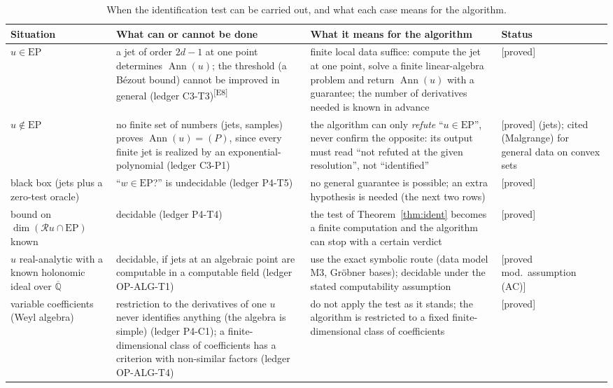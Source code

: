 \documentclass[11pt,a4paper]{article}
\theoremstyle{definition}
\newcommand{\badge}[2]{\textcolor{#1}{\textsf{\footnotesize[#2]}}}
\newcommand{\proved}[1][]{\badge{cC}{proved#1}}
\newcommand{\modulo}[1]{\badge{cD}{proved mod.\ #1}}
\newcommand{\led}[1]{\textcolor{cG}{\textsf{\footnotesize(ledger #1)}}}
\newcommand{\edmark}[1]{\textsuperscript{\textcolor{cB}{\textsf{[#1]}}}}
\newcommand{\Ann}{\operatorname{Ann}}
\newcommand{\EP}{\mathrm{EP}}
\newcommand{\ring}{\mathcal{R}}
\DeclareMathOperator{\dimc}{dim}
\begin{document}
\begin{table}[!htb]
\centering\footnotesize
\begin{tabular}{@{}L{2.5cm}L{4.5cm}L{5.1cm}L{2.3cm}@{}}
\toprule
Situation & What can or cannot be done & What it means for the algorithm & Status\\\midrule
$u\in\EP$ & a jet of order $2d-1$ at one point determines $\Ann(u)$; the threshold (a B\'ezout bound) cannot be improved in general \led{C3-T3}\edmark{E8} & finite local data suffice: compute the jet at one point, solve a finite linear-algebra problem and return $\Ann(u)$ with a guarantee; the number of derivatives needed is known in advance & \proved\\
$u\notin\EP$ & no finite set of numbers (jets, samples) proves $\Ann(u)=(P)$, since every finite jet is realized by an exponential-polynomial \led{C3-P1} & the algorithm can only \emph{refute} ``$u\in\EP$'', never confirm the opposite: its output must read ``not refuted at the given resolution'', not ``identified'' & \proved{} (jets); \textsf{cited (Malgrange) for general data on convex sets}\\
black box (jets plus a zero-test oracle) & ``$w\in\EP$?'' is undecidable \led{P4-T5} & no general guarantee is possible; an extra hypothesis is needed (the next two rows) & \proved\\
bound on $\dimc(\ring u\cap\EP)$ known & decidable \led{P4-T4} & the test of Theorem~\ref{thm:ident} becomes a finite computation and the algorithm can stop with a certain verdict & \proved\\
$u$ real-analytic with a known holonomic ideal over $\overline{\mathbb Q}$ & decidable, if jets at an algebraic point are computable in a computable field \led{OP-ALG-T1} & use the exact symbolic route (data model M3, Gr\"obner bases); decidable under the stated computability assumption & \modulo{assumption (AC)}\\
variable coefficients (Weyl algebra) & restriction to the derivatives of one $u$ never identifies anything (the algebra is simple) \led{P4-C1}; a finite-dimensional class of coefficients has a criterion with non-similar factors \led{OP-ALG-T4} & do not apply the test as it stands; the algorithm is restricted to a fixed finite-dimensional class of coefficients & \proved\\
\bottomrule
\end{tabular}
\caption{When the identification test can be carried out, and what each case means for the algorithm.}\label{tab:limits}
\end{table}
\end{document}
